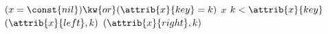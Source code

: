 \begin{codebox}
\li \If $(x = \const{nil}) \kw{ or } (\attrib{x}{key} = k)$
\li \Then
		\Return $x$
\li \Else \If $k < \attrib{x}{key}$
\li 	\Return {}$(\attrib{x}{left},k)$
\li \Else 
\li 	\Return {}$(\attrib{x}{right},k)$
	\End
\end{codebox}